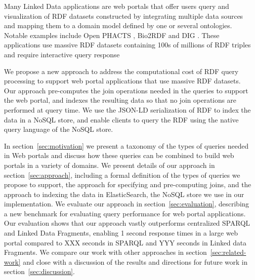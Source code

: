 Many Linked Data applications are web portals that offer users query and visualization of RDF datasets constructed by integrating multiple data sources and mapping them to a domain model defined by one or several ontologies.
Notable examples include Open PHACTS \cite{Groth_Loizou_Gray_Goble_Harland_Pettifer_2014}, Bio2RDF \cite{callahan2013bio2rdf} and DIG \cite{szekely2015building}.
These applications use massive RDF datasets containing 100s of millions of RDF triples and require interactive query response

We propose a new approach to address the computational cost of RDF query processing to support web portal applications that use massive RDF datasets.
Our approach pre-computes the join operations needed in the queries to support the web portal, and indexes the resulting data so that no join operations are performed at query time.
We use the JSON-LD serialization of RDF \cite{Lanthaler:2012:UJC:2307819.2307827} to index the data in a NoSQL store, and enable clients to query the RDF using the native query language of the NoSQL store.

In section~\ref{sec:motivation} we present a taxonomy of the types of queries needed in Web portals and discuss how these queries can be combined to build web portals in a variety of domains.
We present details of our approach in section~\ref{sec:approach}, including a formal definition of the types of queries we propose to support, the approach for specifying and pre-computing joins, and the approach to indexing the data in ElasticSearch, the NoSQL store we use in our implementation.
We evaluate our approach in section~\ref{sec:evaluation}, describing a new benchmark for evaluating query performance for web portal applications. 
Our evaluation shows that our approach vastly outperforms centralized SPARQL and Linked Data Fragments, enabling 1 second response times in a large web portal compared to XXX seconds in SPARQL and YYY seconds in Linked data Fragments.
We compare our work with other approaches in section~\ref{sec:related-work} and close with a discussion of the results and directions for future work in section~\ref{sec:discussion}.
